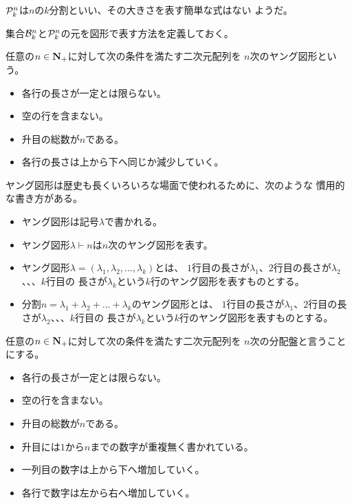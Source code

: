 	${\mathcal{P}}_k^n$は$n$の$k$分割といい、その大きさを表す簡単な式はない
	ようだ。

	集合${\mathcal{B}}_k^n$と${\mathcal{P}}_k^n$の元を図形で表す方法を定義しておく。

	\begin{definition}[ヤング図形]\label{def:ヤング図形} %
		任意の$n\in{\mathbf{N}}_+$に対して次の条件を満たす二次元配列を
		$n$次のヤング図形という。
		\begin{itemize}\setlength{\itemsep}{-1mm} %
			\item 各行の長さが一定とは限らない。
			\item 空の行を含まない。
			\item 升目の総数が$n$である。
			\item 各行の長さは上から下へ同じか減少していく。
		\end{itemize} %
	\end{definition} %

	ヤング図形は歴史も長くいろいろな場面で使われるために、次のような
	慣用的な書き方がある。
	\begin{itemize}\setlength{\itemsep}{-1mm} %
		\item ヤング図形は記号$\lambda$で書かれる。
		\item ヤング図形$\lambda\vdash n$は$n$次のヤング図形を表す。
		\item ヤング図形$\lambda=(\lambda_1,\lambda_2,\dots,\lambda_k)$とは、
		$1$行目の長さが$\lambda_1$、$2$行目の長さが$\lambda_2$、、、$k$行目の
		長さが$\lambda_k$という$k$行のヤング図形を表すものとする。
		\item 分割$n=\lambda_1+\lambda_2+\dots+\lambda_k$のヤング図形とは、
		$1$行目の長さが$\lambda_1$、$2$行目の長さが$\lambda_2$、、、$k$行目の
		長さが$\lambda_k$という$k$行のヤング図形を表すものとする。
	\end{itemize} %

	\begin{definition}[分配盤]\label{def:分配盤} %
		任意の$n\in{\mathbf{N}}_+$に対して次の条件を満たす二次元配列を
		$n$次の分配盤と言うことにする。
		\begin{itemize}\setlength{\itemsep}{-1mm} %
			\item 各行の長さが一定とは限らない。
			\item 空の行を含まない。
			\item 升目の総数が$n$である。
			\item 升目には$1$から$n$までの数字が重複無く書かれている。
			\item 一列目の数字は上から下へ増加していく。
			\item 各行で数字は左から右へ増加していく。
		\end{itemize} %
	\end{definition} %

